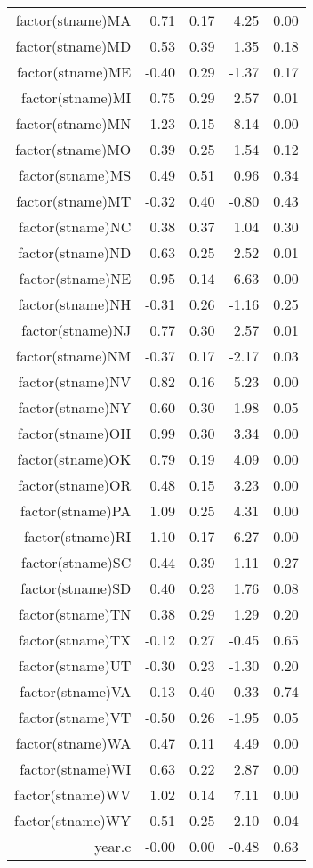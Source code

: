 \begin{table}[ht]
\begin{tabular}{rrrrr}
  factor(stname)MA & 0.71 & 0.17 & 4.25 & 0.00 \\ 
  factor(stname)MD & 0.53 & 0.39 & 1.35 & 0.18 \\ 
  factor(stname)ME & -0.40 & 0.29 & -1.37 & 0.17 \\ 
  factor(stname)MI & 0.75 & 0.29 & 2.57 & 0.01 \\ 
  factor(stname)MN & 1.23 & 0.15 & 8.14 & 0.00 \\ 
  factor(stname)MO & 0.39 & 0.25 & 1.54 & 0.12 \\ 
  factor(stname)MS & 0.49 & 0.51 & 0.96 & 0.34 \\ 
  factor(stname)MT & -0.32 & 0.40 & -0.80 & 0.43 \\ 
  factor(stname)NC & 0.38 & 0.37 & 1.04 & 0.30 \\ 
  factor(stname)ND & 0.63 & 0.25 & 2.52 & 0.01 \\ 
  factor(stname)NE & 0.95 & 0.14 & 6.63 & 0.00 \\ 
  factor(stname)NH & -0.31 & 0.26 & -1.16 & 0.25 \\ 
  factor(stname)NJ & 0.77 & 0.30 & 2.57 & 0.01 \\ 
  factor(stname)NM & -0.37 & 0.17 & -2.17 & 0.03 \\ 
  factor(stname)NV & 0.82 & 0.16 & 5.23 & 0.00 \\ 
  factor(stname)NY & 0.60 & 0.30 & 1.98 & 0.05 \\ 
  factor(stname)OH & 0.99 & 0.30 & 3.34 & 0.00 \\ 
  factor(stname)OK & 0.79 & 0.19 & 4.09 & 0.00 \\ 
  factor(stname)OR & 0.48 & 0.15 & 3.23 & 0.00 \\ 
  factor(stname)PA & 1.09 & 0.25 & 4.31 & 0.00 \\ 
  factor(stname)RI & 1.10 & 0.17 & 6.27 & 0.00 \\ 
  factor(stname)SC & 0.44 & 0.39 & 1.11 & 0.27 \\ 
  factor(stname)SD & 0.40 & 0.23 & 1.76 & 0.08 \\ 
  factor(stname)TN & 0.38 & 0.29 & 1.29 & 0.20 \\ 
  factor(stname)TX & -0.12 & 0.27 & -0.45 & 0.65 \\ 
  factor(stname)UT & -0.30 & 0.23 & -1.30 & 0.20 \\ 
  factor(stname)VA & 0.13 & 0.40 & 0.33 & 0.74 \\ 
  factor(stname)VT & -0.50 & 0.26 & -1.95 & 0.05 \\ 
  factor(stname)WA & 0.47 & 0.11 & 4.49 & 0.00 \\ 
  factor(stname)WI & 0.63 & 0.22 & 2.87 & 0.00 \\ 
  factor(stname)WV & 1.02 & 0.14 & 7.11 & 0.00 \\ 
  factor(stname)WY & 0.51 & 0.25 & 2.10 & 0.04 \\ 
  year.c & -0.00 & 0.00 & -0.48 & 0.63 \\ 
   \hline
\end{tabular}
\end{table}
